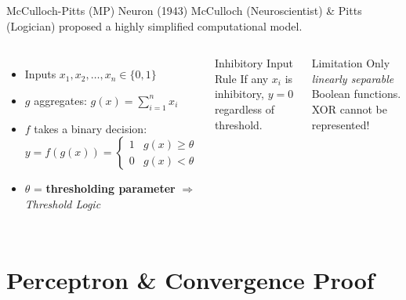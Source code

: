\documentclass{beamer}
\begin{document}
\begin{frame}{McCulloch-Pitts (MP) Neuron (1943)}
  McCulloch (Neuroscientist) \& Pitts (Logician) proposed a highly simplified computational model.
  \vspace{0.2cm}
  \begin{columns}
    \begin{itemize}
      \item Inputs $x_1, x_2, \ldots, x_n \in \{0,1\}$
      \item $g$ aggregates: $\displaystyle g(x) = \sum_{i=1}^{n} x_i$
      \item $f$ takes a binary decision:
        \[
          y = f(g(x)) = \begin{cases} 1 & g(x) \geq \theta \\ 0 & g(x) < \theta \end{cases}
        \]
      \item $\theta$ = \textbf{thresholding parameter} $\Rightarrow$ \emph{Threshold Logic}
    \end{itemize}
    \begin{exampleblock}{Inhibitory Input Rule}
      If any $x_i$ is inhibitory, $y = 0$ regardless of threshold.
    \end{exampleblock}
    \vspace{0.2cm}
    \begin{alertblock}{Limitation}
      Only \emph{linearly separable} Boolean functions. XOR cannot be represented!
    \end{alertblock}
  \end{columns}
\end{frame}

\section{Perceptron \& Convergence Proof}
\end{document}
